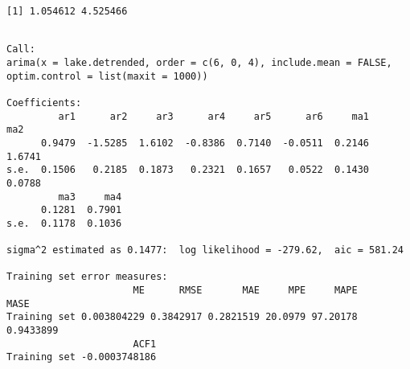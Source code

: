 \documentclass[]{book}
\newenvironment{Shaded}{\begin{snugshade}}{\end{snugshade}}
\newcommand{\KeywordTok}[1]{\textcolor[rgb]{0.13,0.29,0.53}{\textbf{#1}}}
\newcommand{\DataTypeTok}[1]{\textcolor[rgb]{0.13,0.29,0.53}{#1}}
\newcommand{\DecValTok}[1]{\textcolor[rgb]{0.00,0.00,0.81}{#1}}
\newcommand{\StringTok}[1]{\textcolor[rgb]{0.31,0.60,0.02}{#1}}
\newcommand{\CommentTok}[1]{\textcolor[rgb]{0.56,0.35,0.01}{\textit{#1}}}
\newcommand{\OtherTok}[1]{\textcolor[rgb]{0.56,0.35,0.01}{#1}}
\newcommand{\OperatorTok}[1]{\textcolor[rgb]{0.81,0.36,0.00}{\textbf{#1}}}
\newcommand{\NormalTok}[1]{#1}
\begin{document}
\begin{Shaded}
\end{Shaded}

\begin{verbatim}
[1] 1.054612 4.525466
\end{verbatim}

\begin{Shaded}
\end{Shaded}

\begin{verbatim}

Call:
arima(x = lake.detrended, order = c(6, 0, 4), include.mean = FALSE, optim.control = list(maxit = 1000))

Coefficients:
         ar1      ar2     ar3      ar4     ar5      ar6     ma1     ma2
      0.9479  -1.5285  1.6102  -0.8386  0.7140  -0.0511  0.2146  1.6741
s.e.  0.1506   0.2185  0.1873   0.2321  0.1657   0.0522  0.1430  0.0788
         ma3     ma4
      0.1281  0.7901
s.e.  0.1178  0.1036

sigma^2 estimated as 0.1477:  log likelihood = -279.62,  aic = 581.24

Training set error measures:
                      ME      RMSE       MAE     MPE     MAPE      MASE
Training set 0.003804229 0.3842917 0.2821519 20.0979 97.20178 0.9433899
                      ACF1
Training set -0.0003748186
\end{verbatim}
\end{document}
